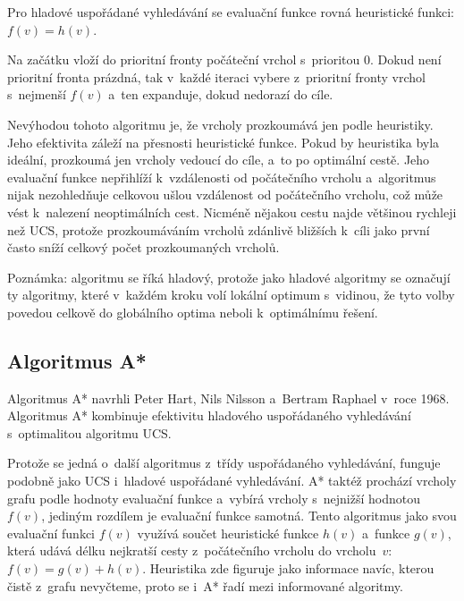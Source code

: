 \documentclass[12pt]{report}			%
\begin{document}
			
			Pro hladové uspořádané vyhledávání se evaluační funkce rovná heuristické funkci: $f(v) = h(v)$. 						
			
			Na začátku vloží do prioritní fronty počáteční vrchol s~prioritou 0.
			Dokud není prioritní fronta prázdná, tak v~každé iteraci vybere z~prioritní fronty vrchol s~nejmenší $f(v)$ a~ten expanduje, dokud nedorazí do cíle.
			
			Nevýhodou tohoto algoritmu je, že vrcholy prozkoumává jen podle heuristiky. %
			Jeho efektivita záleží na přesnosti heuristické funkce. Pokud by heuristika byla ideální,  prozkoumá jen vrcholy vedoucí do cíle, a~to po optimální cestě. Jeho evaluační funkce nepřihlíží k~vzdálenosti od počátečního vrcholu a~algoritmus nijak nezohledňuje celkovou ušlou vzdálenost od počátečního vrcholu, což může vést k~nalezení neoptimálních cest. Nicméně nějakou cestu najde většinou rychleji než UCS, protože prozkoumáváním vrcholů zdánlivě bližších k~cíli jako první často sníží celkový počet prozkoumaných vrcholů.
			
			
			
		
			Poznámka: algoritmu se říká hladový, protože jako hladové algoritmy se označují ty algoritmy, které v~každém kroku volí lokální optimum s~vidinou, že tyto volby povedou celkově do globálního optima neboli k~optimálnímu řešení. 			
			
			
						
			\subsection{Algoritmus A*}
			Algoritmus A* navrhli Peter Hart, Nils Nilsson a~Bertram Raphael v~roce 1968. %
			Algoritmus A* kombinuje efektivitu hladového uspořádaného vyhledávání s~optimalitou algoritmu UCS.
			
			
			Protože se jedná o~další algoritmus z~třídy uspořádaného vyhledávání, funguje podobně jako UCS i~hladové uspořádané vyhledávání. A* taktéž prochází vrcholy grafu podle hodnoty evaluační funkce a~vybírá vrcholy s~nejnižší hodnotou $f(v)$, jediným rozdílem je evaluační funkce samotná.
			Tento algoritmus jako svou evaluační funkci $f(v)$ využívá součet heuristické funkce $h(v)$ a~funkce $g(v)$, která udává délku nejkratší cesty z~počátečního vrcholu do vrcholu~$v$: $f(v) = g(v) + h(v)$. Heuristika zde figuruje jako informace navíc, kterou čistě z~grafu nevyčteme, proto se i~A* řadí mezi informované algoritmy.  
			
\end{document}
